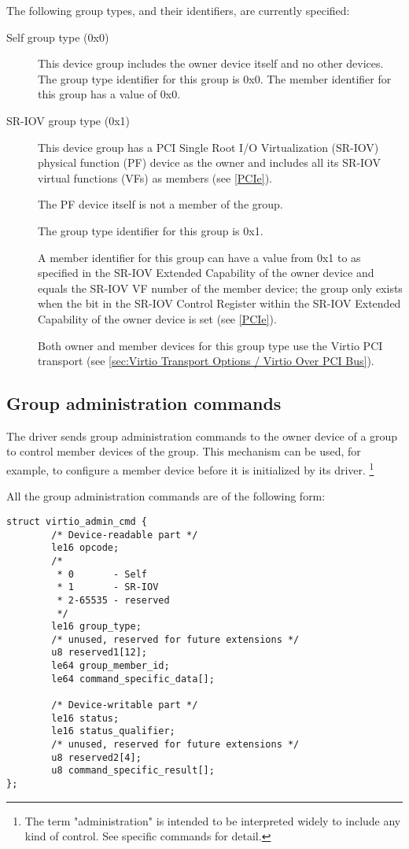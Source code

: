 The following group types, and their identifiers, are currently specified:
\begin{description}
\item[Self group type (0x0)]
This device group includes the owner device itself and no other devices.
The group type identifier for this group is 0x0.
The member identifier for this group has a value of 0x0.

\item[SR-IOV group type (0x1)]
This device group has a PCI Single Root I/O Virtualization
(SR-IOV) physical function (PF) device as the owner and includes
all its SR-IOV virtual functions (VFs) as members (see
\hyperref[intro:PCIe]{[PCIe]}).

The PF device itself is not a member of the group.

The group type identifier for this group is 0x1.

A member identifier for this group can have a value from 0x1 to
 as specified in the
SR-IOV Extended Capability of the owner device
and equals the SR-IOV VF number of the member device;
the group only exists when the  bit
in the SR-IOV Control Register within the
SR-IOV Extended Capability of the owner device is set
(see \hyperref[intro:PCIe]{[PCIe]}).

Both owner and member devices for this group type use the Virtio
PCI transport (see \ref{sec:Virtio Transport Options / Virtio Over PCI Bus}).
\end{description}

\subsection{Group administration commands}\label{sec:Basic Facilities of a Virtio Device / Device groups / Group administration commands}

The driver sends group administration commands to the owner device of
a group to control member devices of the group.
This mechanism can
be used, for example, to configure a member device before it is
initialized by its driver.
\footnote{The term "administration" is intended to be interpreted
widely to include any kind of control. See specific commands
for detail.}

All the group administration commands are of the following form:

\begin{lstlisting}
struct virtio_admin_cmd {
        /* Device-readable part */
        le16 opcode;
        /*
         * 0       - Self
         * 1       - SR-IOV
         * 2-65535 - reserved
         */
        le16 group_type;
        /* unused, reserved for future extensions */
        u8 reserved1[12];
        le64 group_member_id;
        le64 command_specific_data[];

        /* Device-writable part */
        le16 status;
        le16 status_qualifier;
        /* unused, reserved for future extensions */
        u8 reserved2[4];
        u8 command_specific_result[];
};
\end{lstlisting}

